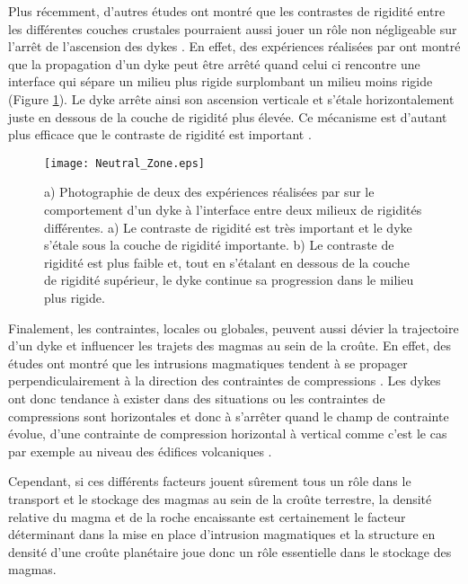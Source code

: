 Plus  récemment, d'autres  études  ont montré  que  les contrastes  de
rigidité  entre les  différentes  couches  crustales pourraient  aussi
jouer un  rôle non  négligeable sur l'arrêt  de l'ascension  des dykes
\citep{Menand:2011ki}.   En  effet,   des  expériences  réalisées  par
\citet{Kavanagh:2006ig} ont  montré que la propagation  d'un dyke peut
être  arrêté quand  celui ci  rencontre  une interface  qui sépare  un
milieu  plus  rigide  surplombant   un  milieu  moins  rigide  (Figure
\ref{Neutral_Zone}). Le  dyke arrête ainsi son  ascension verticale et
s'étale horizontalement juste en dessous de la couche de rigidité plus
élevée. Ce  mécanisme est d'autant  plus efficace que le  contraste de
rigidité est important \citep{Kavanagh:2006ig}.

\begin{figure}
  \begin{center}
    \graphicspath{ {/Users/thorey/Documents/These/Manuscript/Figure/Chapter1/} }
    \texttt{[image: Neutral\_Zone.eps]}
    \caption{a)  Photographie de  deux des  expériences réalisées  par
      \citet{Kavanagh:2006ig}   sur  le   comportement  d'un   dyke  à
      l'interface entre  deux milieux de rigidités  différentes. a) Le
      contraste de rigidité est très important et le dyke s'étale sous
      la couche de  rigidité importante.  b) Le  contraste de rigidité
      est plus faible et, tout en s'étalant en dessous de la couche de
      rigidité  supérieur, le  dyke  continue sa  progression dans  le
      milieu plus rigide.}
    \label{Neutral_Zone}
  \end{center}
\end{figure}


Finalement, les contraintes, locales ou globales, peuvent aussi dévier
la trajectoire d'un dyke et influencer  les trajets des magmas au sein
de la  croûte.  En  effet, des  études ont  montré que  les intrusions
magmatiques tendent  à se propager perpendiculairement  à la direction
des contraintes de  compressions \citep{Anderson:L5JA3dNN}.  Les dykes
ont donc tendance à exister dans  des situations ou les contraintes de
compressions sont horizontales  et donc à s'arrêter quand  le champ de
contrainte  évolue,  d'une  contrainte  de  compression  horizontal  à
vertical  comme  c'est le  cas  par  exemple  au niveau  des  édifices
volcaniques \citep{Pinel:2000wa,Pinel:2004ji,Roman:2014hw}.

Cependant, si  ces différents  facteurs jouent  sûrement tous  un rôle
dans  le transport  et le  stockage des  magmas au  sein de  la croûte
terrestre, la densité relative du magma et de la roche encaissante est
certainement le facteur déterminant dans  la mise en place d'intrusion
magmatiques et  la structure en  densité d'une croûte  planétaire joue
donc un rôle essentielle dans le stockage des magmas.

